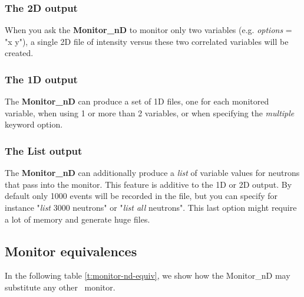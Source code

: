 \subsubsection{The 2D output}

When you ask the {\bf Monitor\_nD} to monitor only two variables (e.g.
{\it options} = "x y"), a single 2D file of intensity versus these two
correlated variables will be created.

\subsubsection{The 1D output}

The {\bf Monitor\_nD} can produce a set of 1D files, one for each
monitored variable, when using 1 or more than 2 variables, or when
specifying the {\it multiple} keyword option.

\subsubsection{The List output}

The {\bf Monitor\_nD} can additionally produce a {\it list} of variable
values for neutrons that pass into the monitor. This feature is additive
to the 1D or 2D output. By default only 1000 events will be recorded in
the file, but you can specify for instance "{\it list} 3000 neutrons" or
"{\it list all} neutrons". This last option might require a lot of
memory and generate huge files.

\subsection{Monitor equivalences}

In the following table \ref{t:monitor-nd-equiv}, we show how the Monitor\_nD may substitute any other \MCS\ monitor.


